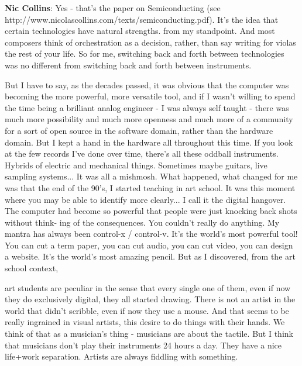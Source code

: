 \textbf{Nic Collins}: Yes - that’s the paper on Semiconducting (see http://www.nicolascollins.com/texts/semiconducting.pdf). It’s the idea that certain technologies have natural strengths. from my standpoint. And most composers think of orchestration as a decision, rather, than say writing for violas the rest of your life. So for me, switching back and forth between technologies was no different from switching back and forth between instruments.
					
But I have to say, as the decades passed, it was obvious that the computer was becoming the more powerful, more versatile tool, and if I wasn’t willing to spend the time being a brilliant analog engineer - I was always self taught - there was much more possibility and much more openness and much more of a community for a sort of open source in the software domain, rather than the hardware domain. But I kept a hand in the hardware all throughout this time. If you look at the few records I’ve done over time, there’s all these oddball instruments. Hybrids of electric and mechanical things. Sometimes maybe guitars, live sampling systems... It was all a mishmosh. What happened, what changed for me was that the end of the 90’s, I started teaching in art school. It was this moment where you may be able to identify more clearly... I call it the digital hangover. The computer had become so powerful that people were just knocking back shots without think- ing of the consequences. You couldn’t really do anything. My mantra has always been control-x / control-v. It’s the world’s most powerful tool! You can cut a term paper, you can cut audio, you can cut video, you can design a website. It’s the world’s most amazing pencil. But as I discovered, from the art school context,
				
					
art students are peculiar in the sense that every single one of them, even if now they do exclusively digital, they all started drawing. There is not an artist in the world that didn’t scribble, even if now they use a mouse. And that seems to be really ingrained in visual artists, this desire to do things with their hands. We think of that as a musician’s thing - musicians are about the tactile. But I think that musicians don’t play their instruments 24 hours a day. They have a nice life+work separation. Artists are always fiddling with something.
					
